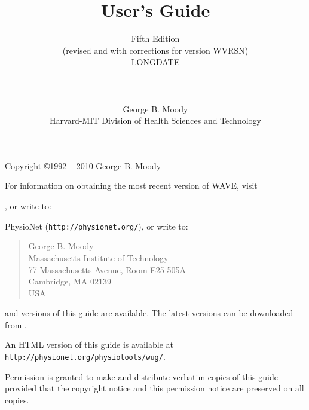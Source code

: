 \documentclass[twoside]{book}
\title{\WAVE{} User's Guide}
\author{Fifth Edition\\
(revised and with corrections for \WAVE{} version WVRSN)\\
LONGDATE\\
\\
\\
\\
George B. Moody\\
Harvard-MIT Division of Health Sciences and Technology}
\date{}
\newcommand{\WAVE}{{\sf WAVE}\xspace}
\begin{document}
\begin{htmlonly}
\end{htmlonly}
\begin{latexonly}
\end{latexonly}

\maketitle

\pagestyle{empty}
\vspace*{\fill}
\noindent
Copyright \copyright 1992 -- 2010 George B. Moody

\vspace{1 in}
\noindent
For information on obtaining the most recent version of \WAVE{},
visit
\begin{htmlonly}
, or write to:
\end{htmlonly}
\begin{latexonly}
PhysioNet ({\tt http://physionet.org/}), or write to:
\end{latexonly}

\begin{quote}
George B. Moody\\
Massachusetts Institute of Technology\\
77 Massachusetts Avenue, Room E25-505A\\
Cambridge, MA 02139\\
USA\\
\end{quote}

\begin{htmlonly}
\noindent
{} and
 versions of this guide are available.
The latest versions can be downloaded from
.
\end{htmlonly}
\begin{latexonly}
\noindent
An HTML version of this guide is available at
{\tt http://physio\-net.\-org/\-physio\-tools/\-wug/}.
\end{latexonly}

\vspace{0.2 in}
\noindent
Permission is granted to make and distribute verbatim copies of this
guide provided that the copyright notice and this permission notice are
preserved on all copies.
\end{document}
